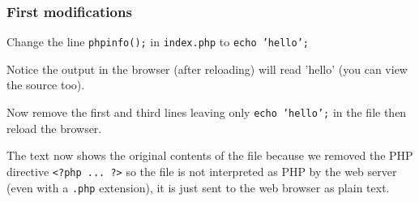 \documentclass[letterpaper]{article}
\begin{document}
\subsubsection*{First modifications}

Change the line {\tt phpinfo();} in {\tt index.php} to {\tt echo 'hello';}

Notice the output in the browser (after reloading) will read 'hello' (you can
view the source too).

Now remove the first and third lines leaving only {\tt echo 'hello';} in the
file then reload the browser.

The text now shows the original contents of the file because we removed the
PHP directive {\tt <?php ... ?>} so the file is not interpreted as PHP by the
web server (even with a {\tt .php} extension), it is just sent to the web
browser as plain text.

\end{document}
